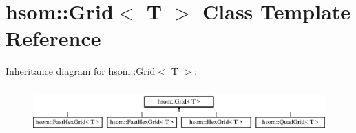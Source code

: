 \hypertarget{classhsom_1_1_grid}{\section{hsom\-:\-:\-Grid$<$ \-T $>$ \-Class \-Template \-Reference}
\label{classhsom_1_1_grid}
}
\-Inheritance diagram for hsom\-:\-:\-Grid$<$ \-T $>$\-:\begin{figure}[H]
\begin{center}
\leavevmode
\includegraphics[height=1.794872cm]{classhsom_1_1_grid}
\end{center}
\end{figure}
